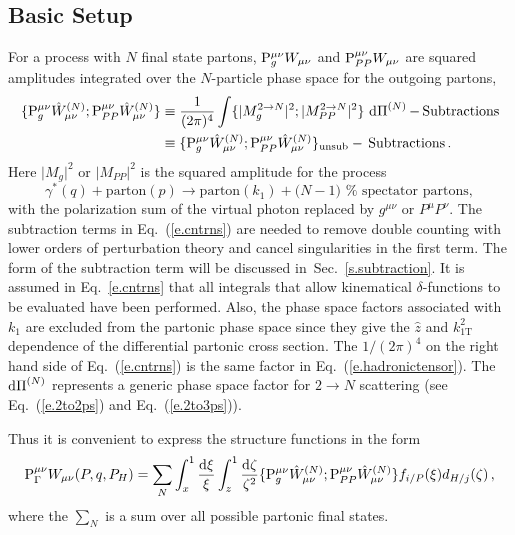\documentclass[prd,preprintnumbers,nofootinbib,superscriptaddress,onecolumn,preprint]{revtex4-1}
\newcommand\3[1]{\boldsymbol{#1}}
\newcommand{\Tscsq}[2]{#1^2_{#2\text{T}}}
\newcommand{\contractor}[1]{\ensuremath{{\rm P}}_{#1}}
\newcommand{\contractortot}[1]{\ensuremath{{\rm P}}_{#1}}
\newcommand{\ps}{\ensuremath{\Pi}}
\newcommand{\eref}[1]{Eq.~(\ref{e.#1})}
\newcommand{\sref}[1]{Sec.~\ref{s.#1}}
\begin{document}
\subsection{Basic Setup}
For a process with $N$ final state partons,
$\contractortot{g}^{\mu\nu} W_{\mu\nu}$ and
$\contractortot{PP}^{\mu\nu} W_{\mu\nu}$ are squared amplitudes
integrated over the $N$-particle phase space for the outgoing partons,
%
\begin{align}
 \{ \contractor{g}^{\mu \nu}  \hat{W}^{(N)}_{\mu\nu}; 
    \contractor{PP}^{\mu \nu} \hat{W}^{(N)}_{\mu\nu}\}
&{} \equiv 
 \frac{1}{(2 \pi)^4} \int 
  \{\lvert M^{2\to N}_g\rvert^2;\lvert M^{2\to N}_{PP}\rvert^2\} \, 
  \diff{\ps}^{(N)} - \, {\rm Subtractions} \nonumber \\
&{} \equiv  \{ \contractor{g}^{\mu \nu}  \hat{W}^{(N)}_{\mu\nu}; 
    \contractor{PP}^{\mu \nu} \hat{W}^{(N)}_{\mu\nu}\}_{\rm unsub} - \, {\rm Subtractions} \, . 
\label{e.cntrns}
\end{align}
%
Here $\lvert M_g \rvert^2$ or $\lvert M_{PP} \rvert^2$ is the squared
amplitude for the process 
%
$$\gamma^\ast(q) + \text{parton}(p) \to \text{parton}(k_1) + \text{($N-1$) 
%
spectator partons},$$ with the polarization sum of the virtual photon
replaced by $g^{\mu\nu}$ or $P^{\mu}P^{\nu}$.  The subtraction terms
in \eref{cntrns} are needed to remove double counting with lower
orders of perturbation theory and cancel singularities in the first
term. The form of the subtraction term will be discussed
in~\sref{subtraction}. 
% 
It is assumed in Eq.~\eqref{e.cntrns} that all integrals that allow
kinematical $\delta$-functions to be evaluated have been performed.
Also, the phase space factors associated with $k_1$ are excluded from
the partonic phase space since they give the $\hat{z}$ and
$\Tscsq{k}{1}$ dependence of the differential partonic cross section.
The $1/(2 \pi)^4$ on the right hand side of \eref{cntrns} is the same
factor in \eref{hadronictensor}. The $\diff{\ps}^{(N)}$ 
represents a generic phase
space factor for $2 \to N$ scattering (see \eref{2to2ps} and
\eref{2to3ps}).

Thus it is convenient to express the structure functions in the form
%
\begin{equation}
\contractortot{\Gamma}^{\mu \nu} W_{\mu \nu}(P,q,P_H)
= \sum_{N} \int_{x}^{1} \frac{\diff{\xi}}{\xi} 
  \int_{z}^{1} \frac{\diff{\zeta}}{\zeta^2}  \{ \contractor{g}^{\mu \nu}  \hat{W}^{(N)}_{\mu\nu}; 
    \contractor{PP}^{\mu \nu} \hat{W}^{(N)}_{\mu\nu}\} f_{i/P}(\xi) d_{H/j}(\zeta) \, ,
\label{e.had2par}
\end{equation}
%
where the $\sum_N$ is a sum over all possible partonic final states.
\end{document}

